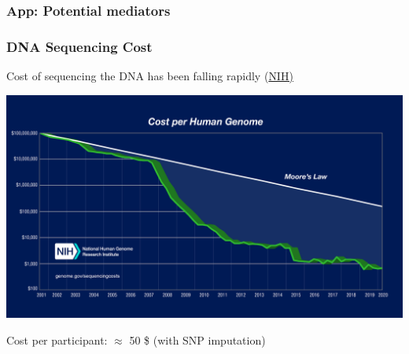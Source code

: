 \documentclass[10pt,compress,xcolor=dvipsnames,aspectratio=169]{beamer}    %
\newcounter{ex}
\newcommand{\1}[1]{\mathrm{1\hspace*{-2.5pt}l}[#1]}	%
\begin{document}
\subsubsection{App: Potential mediators}
%

\begin{frame}\label{frame:dollargenome}
\frametitle{DNA Sequencing Cost}
Cost of sequencing the DNA has been falling rapidly (\href{https://www.genome.gov/about-genomics/fact-sheets/Sequencing-Human-Genome-cost}{NIH)}

\includegraphics[height=0.7\textheight]{./include/Sequencing_Cost_per_Genome_May2020.jpg}

\vspace{2ex}

Cost per participant: $\approx$ 50 \$ (with SNP imputation)

\hyperlink{frame:why}{}

\end{frame}
\end{document}
